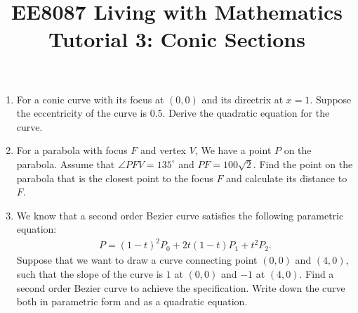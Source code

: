 \documentclass{article}
\title{EE8087 Living with Mathematics\\Tutorial 3: Conic Sections}
\date{}
\begin{document}
 \maketitle
\begin{enumerate}
\item For a conic curve with its focus at $(0,0)$ and its directrix at $x = 1$. Suppose the eccentricity of the curve is 0.5. Derive the quadratic equation for the curve.


\item For a parabola with focus $F$ and vertex $V$, We have a point $P$ on the parabola. Assume that $\angle PFV = 135^\circ$ and $PF = 100\sqrt{2}$. Find the point on the parabola that is the closest point to the focus $F$ and calculate its distance to $F$.
  
\begin{figure}[h]
  \centering
{}
\end{figure}
\item We know that a second order Bezier curve satisfies the following parametric equation:
\begin{align*}
  P = (1-t)^2P_0 + 2t(1-t)P_1 + t^2 P_2.
\end{align*}
Suppose that we want to draw a curve connecting point $(0,0)$ and $(4,0)$, such that the slope of the curve is $1$ at $(0,0)$ and $-1$ at $(4,0)$. Find a second order Bezier curve to achieve the specification. Write down the curve both in parametric form and as a quadratic equation.

\begin{figure}[h]
  \centering
\end{figure}
\end{enumerate}
\end{document}

